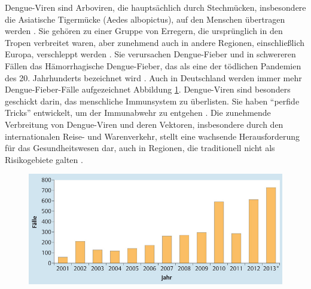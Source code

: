 \documentclass[german,version-2022-01]{uzl-thesis}
\begin{document}
Dengue-Viren sind Arboviren, die haupts\"achlich durch Stechm\"ucken, insbesondere die Asiatische Tigerm\"ucke (Aedes albopictus), auf den Menschen \"ubertragen werden \cite{cramer_dengue-virus_2014}. Sie geh\"oren zu einer Gruppe von Erregern, die urspr\"unglich in den Tropen verbreitet waren, aber zunehmend auch in andere Regionen, einschlie\ss{}lich Europa, verschleppt werden \cite{cramer_dengue-virus_2014}. Sie verursachen Dengue-Fieber und in schwereren F\"allen das H\"amorrhagische Dengue-Fieber, das als eine der t\"odlichen Pandemien des 20. Jahrhunderts bezeichnet wird \cite{kuhnle_dengue-fieber_1999}. Auch in Deutschland werden immer mehr Dengue-Fieber-F\"alle aufgezeichnet Abbildung \ref{fig:Dengue_virus_infektionszahlen_deutschland}. Dengue-Viren sind besonders geschickt darin, das menschliche Immunsystem zu \"uberlisten. Sie haben "`perfide Tricks"' entwickelt, um der Immunabwehr zu entgehen \cite{janisch_klein_2017}. Die zunehmende Verbreitung von Dengue-Viren und deren Vektoren, insbesondere durch den internationalen Reise- und Warenverkehr, stellt eine wachsende Herausforderung f\"ur das Gesundheitswesen dar, auch in Regionen, die traditionell nicht als Risikogebiete galten \cite{cramer_dengue-virus_2014}. 
\begin{figure}[htpb]
  \centering
  \includegraphics[scale=0.5]{Images/infektionszahlen_dengue_virus_deutschland.jpeg}
  \caption{ \cite{cramer_dengue-virus_2014}}
  \label{fig:Dengue_virus_infektionszahlen_deutschland}
\end{figure}
\end{document}
